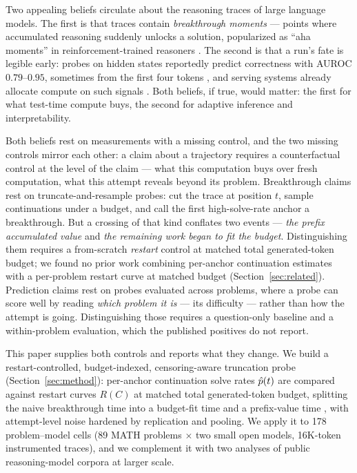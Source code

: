 
Two appealing beliefs circulate about the reasoning traces of large
language models. The first is that traces contain \emph{breakthrough
moments} --- points where accumulated reasoning suddenly unlocks a
solution, popularized as ``aha moments'' in reinforcement-trained
reasoners \citep{deepseekr1}. The second is that a run's fate is legible
early: probes on hidden states reportedly predict correctness
with AUROC $0.79$--$0.95$, sometimes from the first four tokens
\citep{zhang2025knowright, yuan2026diagnostic, david2025temporal,
sun2026trajectories}, and
serving systems already allocate compute on such signals
\citep{fu2024certaindex, fu2025deepconf}. Both beliefs, if true, would
matter: the first for what test-time compute buys, the second for
adaptive inference and interpretability.

Both beliefs rest on measurements with a missing control, and the two
missing controls mirror each other: a claim about a trajectory requires a
counterfactual control at the level of the claim --- what this
computation buys over fresh computation, what this attempt reveals beyond
its problem. Breakthrough claims rest on
truncate-and-resample probes: cut the trace at position $t$, sample
continuations under a budget, and call the first high-solve-rate anchor a
breakthrough. But a crossing of that kind conflates two events ---
\emph{the prefix accumulated value} and \emph{the remaining work began to
fit the budget}. Distinguishing them requires a from-scratch \emph{restart}
control at matched total generated-token budget; we found no prior work
combining per-anchor continuation estimates with a per-problem restart
curve at matched budget (Section~\ref{sec:related}).
Prediction claims rest on probes evaluated across problems, where a probe
can score well by reading \emph{which problem it is} --- its difficulty
--- rather than how the attempt is going. Distinguishing those requires a
question-only baseline and a within-problem evaluation, which the
published positives do not report.

This paper supplies both controls and reports what they change. We build a
restart-controlled, budget-indexed, censoring-aware truncation probe
(Section~\ref{sec:method}): per-anchor continuation solve rates
$\hat{p}(t)$ are compared against restart curves $R(C)$ at matched total
generated-token budget, splitting the naive breakthrough time into a budget-fit time
\Tf{} and a prefix-value time \Tv, with attempt-level noise hardened by
replication and pooling. We apply it to 178 problem--model cells (89 MATH
problems $\times$ two small open models, 16K-token instrumented traces),
and we complement it with two analyses of public reasoning-model corpora
at larger scale.

